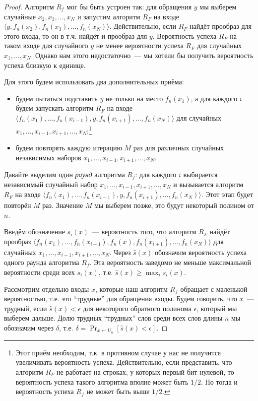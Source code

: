 \documentclass[12pt]{article}
\theoremstyle{definition}
\theoremstyle{plain}
\theoremstyle{remark}
\begin{document}
\begin{proof}
Алгоритм $R_f$ мог бы быть устроен так: для обращения $y$ мы выберем 
случайные $x_2, x_3,\dotsc,x_N$ и запустим алгоритм $R_F$ на входе
$\langle y, f_n(x_2), f_n(x_3),\dotsc,f_n(x_N)\rangle$. Действительно,
если $R_F$ найдёт прообраз для этого входа, то он в т.ч. найдёт
и прообраз для $y$. Вероятность успеха $R_F$ на таком входе 
для случайного $y$ не менее вероятности успеха $R_F$ для случайных
$x_1,\dotsc,x_N$. Однако нам этого недостаточно~--- мы хотели бы получить
вероятность успеха близкую к единице. 

Для этого будем использовать два дополнительных приёма:
\begin{itemize}
\item будем пытаться подставить $y$ не только на место $f_n(x_1)$, а 
для каждого $i$ будем запускать алгоритм $R_F$ на входе
$\langle f_n(x_1),\dotsc, f_n(x_{i-1}), y,  f_n(x_{i+1}),\dotsc,f_n(x_N)\rangle$ для случайных
$x_1,\dotsc, x_{i-1}, x_{i+1},\dotsc,x_N$;\footnote{Этот приём необходим, т.к. в противном случае
у нас не получится увеличивать вероятность успеха. Действительно, если представить, что алгоритм 
$R_F$ не работает на строках, у которых первый бит нулевой, то вероятность успеха такого алгоритма
вполне может быть $1/2$. Но тогда и вероятность успеха $R_f$ не может быть выше $1/2$.}
\item будем повторять каждую итерацию $M$ раз для различных случайных независимых наборов $x_1,\dotsc, x_{i-1},x_{i+1},\dotsc,x_N$.
\end{itemize}

Давайте выделим один \emph{раунд} алгоритма $R_f$: для каждого $i$ выбирается 
независимый случайный набор $x_1,\dotsc, x_{i-1},x_{i+1},\dotsc,x_N$
и вызывается алгоритм $R_F$ на входе 
$\langle f_n(x_1),\dotsc, f_n(x_{i-1}), y,  f_n(x_{i+1}),\dotsc,f_n(x_N)\rangle$.
Этот этап будет повторён $M$ раз. Значение $M$ мы выберем позже, это будут некоторый полином от $n$. 

Введём обозначение $s_i(x)$~--- вероятность того, что алгоритм $R_F$ найдёт прообраз 
$\langle f_n(x_1),\dotsc, f_n(x_{i-1}), f_n(x),  f_n(x_{i+1}),\dotsc,f_n(x_N)\rangle$
для случайных $x_1,\dotsc, x_{i-1},x_{i+1},\dotsc,x_N$. Через $\hat s(x)$ обозначим
вероятность успеха одного раунда алгоритма $R_f$. Эта вероятность заведомо не меньше
максимальной вероятности среди всех $s_i(x)$, т.е. $\hat s(x) \ge \max_i s_i(x)$. 

Рассмотрим отдельно входы $x$, которые наш алгоритм $R_f$ обращает с маленькой
вероятностью, т.е. это ``трудные'' для обращения входы. Будем говорить, что $x$~--- трудный, 
если $\hat s(x) < \epsilon$ для некоторого обратного полинома $\epsilon$,
который мы выберем дальше. 
Долю трудных ``трудных'' слов среди всех слов длины $n$ мы обозначим через $\delta$,
т.е. $\delta = \Pr_{x\gets U_n}[\hat s(x) < \epsilon]$. 


\end{proof}
\end{document}
